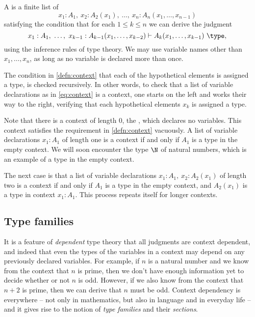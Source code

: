 \begin{defn}\label{defn:context}
  A  is a finite list of 
\begin{equation}\label{eq:context}
x_1:A_1,~x_2:A_2(x_1),~\ldots,~x_n:A_n(x_1,\ldots,x_{n-1})
\end{equation}
satisfying the condition that for each $1\leq k\leq n$ we can derive the judgment
\begin{equation*}
  x_1:A_1,~\ldots,~x_{k-1}:A_{k-1}(x_1,\ldots,x_{k-2})\vdash A_k(x_1,\ldots,x_{k-1})~\type,
\end{equation*}
using the inference rules of type theory. We may use variable names other than $x_1,\ldots,x_n$, as long as no variable is declared more than once.
\end{defn}

The condition in \cref{defn:context} that each of the hypothetical elements is assigned a type, is checked recursively. In other words, to check that a list of variable declarations as in \cref{eq:context} is a context, one starts on the left and works their way to the right, verifying that each hypothetical elements $x_k$ is assigned a type. 

Note that there is a context of length $0$, the , which declares no variables. This context satisfies the requirement in \cref{defn:context} vacuously. A list of variable declarations $x_1:A_1$ of length one is a context if and only if $A_1$ is a type in the empty context. We will soon encounter the type $\N$ of natural numbers, which is an example of a type in the empty context.

The next case is that a list of variable declarations $x_1:A_1,~x_2:A_2(x_1)$ of length two is a context if and only if $A_1$ is a type in the empty context, and $A_2(x_1)$ is a type in context $x_1:A_1$. This process repeats itself for longer contexts.

\subsection{Type families}
It is a feature of \emph{dependent} type theory that all judgments are context dependent, and indeed that even the types of the variables in a context may depend on any previously declared variables. For example, if $n$ is a natural number and we know from the context that $n$ is prime, then we don't have enough information yet to decide whether or not $n$ is odd. However, if we also know from the context that $n+2$ is prime, then we can derive that $n$ must be odd. Context dependency is everywhere -- not only in mathematics, but also in language and in everyday life -- and it gives rise to the notion of \emph{type families} and their \emph{sections}.

